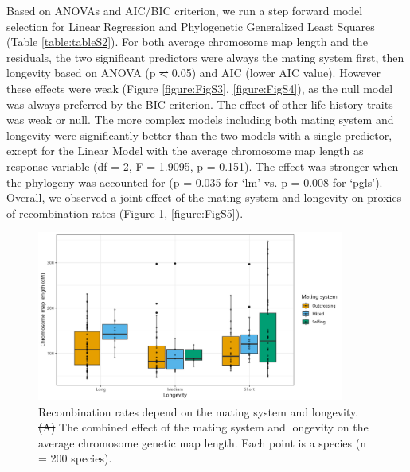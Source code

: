 \documentclass{article}
\providecommand{\DIFaddtex}[1]{{\protect\color{blue}\uwave{#1}}} %
\providecommand{\DIFdeltex}[1]{{\protect\color{red}\sout{#1}}}                      %
\providecommand{\DIFaddbegin}{} %
\providecommand{\DIFaddend}{} %
\providecommand{\DIFdelbegin}{} %
\providecommand{\DIFdelend}{} %
\providecommand{\DIFdelFL}[1]{\DIFdel{#1}} %
\providecommand{\DIFdelbeginFL}{} %
\providecommand{\DIFdelendFL}{} %
\providecommand{\DIFadd}[1]{\texorpdfstring{\DIFaddtex{#1}}{#1}} %
\providecommand{\DIFdel}[1]{\texorpdfstring{\DIFdeltex{#1}}{}} %
\newcommand{\DIFscaledelfig}{0.5}
\newlength{\DIFdelgraphicswidth} %
\newlength{\DIFdelgraphicsheight} %
\newcommand{\DIFaddincludegraphics}[2][]{{\color{blue}\fbox{\DIFOincludegraphics[#1]{#2}}}} %
\newcommand{\DIFdelincludegraphics}[2][]{%
\sbox{\DIFdelgraphicsbox}{\DIFOincludegraphics[#1]{#2}}%
\settoboxwidth{\DIFdelgraphicswidth}{\DIFdelgraphicsbox} %
\settoboxtotalheight{\DIFdelgraphicsheight}{\DIFdelgraphicsbox} %
\scalebox{\DIFscaledelfig}{%
\parbox[b]{\DIFdelgraphicswidth}{\usebox{\DIFdelgraphicsbox}\\[-\baselineskip] \rule{\DIFdelgraphicswidth}{0em}}\llap{\resizebox{\DIFdelgraphicswidth}{\DIFdelgraphicsheight}{%
\setlength{\unitlength}{\DIFdelgraphicswidth}%
\begin{picture}(1,1)%
\thicklines\linethickness{2pt} %
{\color[rgb]{1,0,0}\put(0,0){\framebox(1,1){}}}%
{\color[rgb]{1,0,0}\put(0,0){\line( 1,1){1}}}%
{\color[rgb]{1,0,0}\put(0,1){\line(1,-1){1}}}%
\end{picture}%
}\hspace*{3pt}}} %
} %
\DeclareRobustCommand{\DIFaddbegin}{\DIFOaddbegin \let\includegraphics\DIFaddincludegraphics} %
\DeclareRobustCommand{\DIFaddend}{\DIFOaddend \let\includegraphics\DIFOincludegraphics} %
\DeclareRobustCommand{\DIFdelbegin}{\DIFOdelbegin \let\includegraphics\DIFdelincludegraphics} %
\DeclareRobustCommand{\DIFdelend}{\DIFOaddend \let\includegraphics\DIFOincludegraphics} %
\DeclareRobustCommand{\DIFdelbeginFL}{\DIFOdelbeginFL \let\includegraphics\DIFdelincludegraphics} %
\DeclareRobustCommand{\DIFdelendFL}{\DIFOaddendFL \let\includegraphics\DIFOincludegraphics} %
\begin{document}
Based on ANOVAs and AIC/BIC criterion, we run a step forward model selection for Linear Regression and Phylogenetic Generalized Least Squares (Table \ref{table:tableS2}). For both average chromosome map length and the residuals, the two significant predictors were always the mating system first, then longevity based on ANOVA (p \DIFdelbegin \DIFdel{< }\DIFdelend \DIFaddbegin \DIFadd{$<$ }\DIFaddend 0.05) and AIC (lower AIC value). However these effects were weak (Figure \ref{figure:FigS3}, \ref{figure:FigS4}), as the null model was always preferred by the BIC criterion. The effect of other life history traits was weak or null. The more complex models including both mating system and longevity were significantly better than the two models with a single predictor, except for the Linear Model with the average chromosome map length as response variable (df = 2, F = 1.9095, p = 0.151). The effect was stronger when the phylogeny was accounted for (p = 0.035 for ‘lm’ vs. p = 0.008 for ‘pgls’). Overall, we observed a joint effect of the mating system and longevity on proxies of recombination rates (Figure \ref{figure:Fig2}, \ref{figure:FigS5}).



\begin{figure}[h!]
  \includegraphics[width=0.9\textwidth]{figures/Fig2.jpeg}
  \centering
  \caption{Recombination rates depend on the mating system and longevity. \DIFdelbeginFL \DIFdelFL{(A) }\DIFdelendFL The combined effect of the mating system and longevity on the average chromosome genetic map length. Each point is a species (n = 200 species).
  }
  \label{figure:Fig2}
\end{figure}
\end{document}
